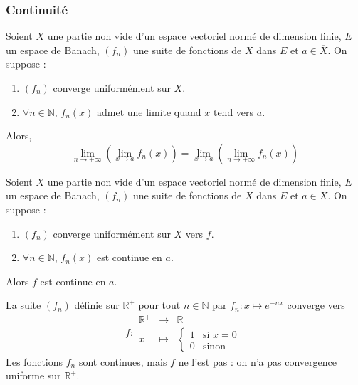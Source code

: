   \subsubsection{Continuité}


  \begin{theorem}
    Soient $X$ une partie non vide d'un espace vectoriel normé de dimension finie, $E$ un espace de Banach, $(f_n)$ une suite de fonctions de $X$ dans $E$ et $a \in \overline{X}$. On suppose :
    \begin{enumerate}[label=(\roman*)]
      \item $(f_n)$ converge uniformément sur $X$.
      \item $\forall n \in \mathbb{N}, \, f_n(x)$ admet une limite quand $x$ tend vers $a$.
    \end{enumerate}
    Alors,
    \[ \lim_{n \rightarrow +\infty} \left( \lim_{x \rightarrow a} f_n(x) \right) = \lim_{x \rightarrow a} \left( \lim_{n \rightarrow +\infty} f_n(x) \right) \]
  \end{theorem}

  \begin{theorem}
    Soient $X$ une partie non vide d'un espace vectoriel normé de dimension finie, $E$ un espace de Banach, $(f_n)$ une suite de fonctions de $X$ dans $E$ et $a \in X$. On suppose :
    \begin{enumerate}[label=(\roman*)]
      \item $(f_n)$ converge uniformément sur $X$ vers $f$.
      \item $\forall n \in \mathbb{N}, \, f_n(x)$ est continue en $a$.
    \end{enumerate}
    Alors $f$ est continue en $a$.
  \end{theorem}

  \begin{example}
    La suite $(f_n)$ définie sur $\mathbb{R}^+$ pour tout $n \in \mathbb{N}$ par $f_n : x \mapsto e^{-nx}$ converge vers
    \[
    f :
    \begin{array}{ccc}
      \mathbb{R}^+ &\rightarrow& \mathbb{R}^+ \\
      x &\mapsto& \begin{cases}
        1 &\text{si } x = 0 \\
        0 &\text{sinon}
      \end{cases}
    \end{array}
    \]
    Les fonctions $f_n$ sont continues, mais $f$ ne l'est pas : on n'a pas convergence uniforme sur $\mathbb{R}^+$.
  \end{example}

